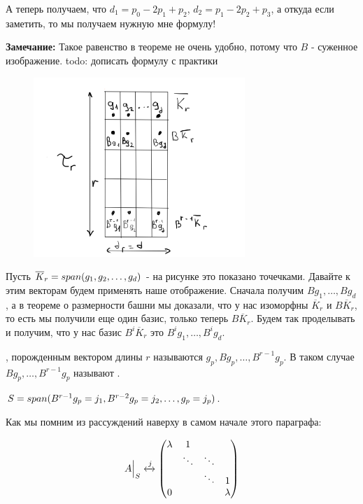 А теперь получаем, что $d_1 = p_0 - 2p_1 + p_2$, $d_2 = p_1-2p_2 + p_3$, а откуда если заметить, то мы получаем нужную мне формулу!

\textbf{Замечание:} Такое равенство в теореме не очень удобно, потому что $B $ - суженное изображение.  todo: дописать формулу с практики

\begin{figure} 
\begin{center}
    \includegraphics[width = 8cm]{assets/7_9-zhordan-table.png}
\end{center}
\end{figure}

Пусть $\overline{K}_r = span(g_1,g_2,\ldots,g_d)$ - на рисунке это показано точечками. Давайте к этим векторам будем применять наше отображение. Сначала получим $Bg_1,\ldots,Bg_d$, а в теореме о размерности башни мы доказали, что у нас изоморфны $\overline{K}_r$ и $B\overline{K}_r$, то есть мы получили еще один базис, только теперь $B\overline{K}_r$. Будем так проделывать и получим, что у нас базис $B^i\overline{K}_r$ это $B^ig_1,\ldots, B^ig_d$.

 , порожденным вектором длины $r$ называются $g_p,Bg_p,\ldots,B^{r-1}g_p$. В таком случае $Bg_p,\ldots,B^{r-1}g_p$ называют .

$S = span (B^{r-1}g_p = j_1, B^{r-2}g_p =j_2 ,\ldots,g_p=j_p)$.

Как мы помним из рассуждений наверху в самом начале этого параграфа:

$$A\Big|_S  \xleftrightarrow{j}\begin{pmatrix}
    \lambda & 1 & &\\
     & \ddots &\ddots &\\
     & & \ddots & 1 \\
     0& &  &\lambda 
\end{pmatrix}$$


